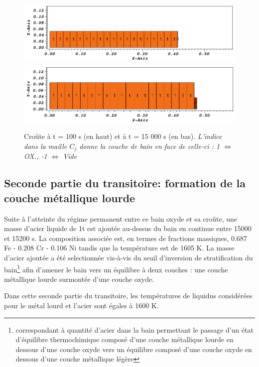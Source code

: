 \begin{figure}[H]
\centering
\includegraphics[width=\textwidth, keepaspectratio=true]{Figures/coriumCrust_100.png}\\
\includegraphics[width=\textwidth, keepaspectratio=true]{Figures/coriumCrust_15000.png}
\caption{Croûte à t = 100 s (en haut) et à t = 15 000 s (en bas). \textit{L'indice dans la maille $C_j$ donne la couche de bain en face de celle-ci : 1 $\Leftrightarrow$ OX., -1 $\Leftrightarrow$ Vide}}
\label{fig:croutes_1}
\end{figure}

\subsection{Seconde partie du transitoire: formation de la couche métallique lourde}

Suite à l'atteinte du régime permanent entre ce bain oxyde et sa croûte, une masse d'acier liquide de 1t est ajoutée au-dessus du bain en continue entre 15000 et 15200 s. La composition associée est, en termes de fractions massiques, 0.687 Fe - 0.208 Cr - 0.106 Ni tandis que la température est de 1605 K. La masse d'acier ajoutée a été selectionnée vis-à-vis du seuil d'inversion de stratification du bain\footnote{correspondant à quantité d'acier dans la bain permettant le passage d'un état d'équilibre thermochimique composé d'une couche métallique lourde en dessous d'une couche oxyde vers un équilibre composé d'une couche oxyde en dessous d'une couche métallique légère} afin d'amener le bain vers un équilibre à deux couches : une couche métallique lourde surmontée d'une couche oxyde.

Dans cette seconde partie du transitoire, les températures de liquidus considérées pour le métal lourd et l'acier sont égales à 1600 K.

